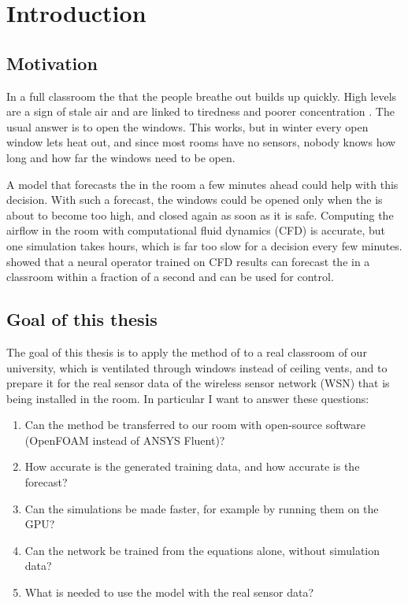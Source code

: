 \chapter{Introduction}
\label{ch:intro}

\section{Motivation}
In a full classroom the \cotwo{} that the people breathe out builds up quickly. High \cotwo{} levels are
a sign of stale air and are linked to tiredness and poorer concentration . The usual answer is to open the windows. This works, but in winter every open
window lets heat out, and since most rooms have no sensors, nobody knows how long and how far the windows
need to be open.

A model that forecasts the \cotwo{} in the room a few minutes ahead could help with this decision. With
such a forecast, the windows could be opened only when the \cotwo{} is about to become too high, and
closed again as soon as it is safe. Computing the airflow in the room with computational fluid dynamics
(CFD) is accurate, but one simulation takes hours, which is far too slow for a decision every few minutes.
\citet{bian2025} showed that a neural operator trained on CFD results can forecast the \cotwo{} in a
classroom within a fraction of a second and can be used for control.

\section{Goal of this thesis}
The goal of this thesis is to apply the method of \citet{bian2025} to a real classroom of our university,
which is ventilated through windows instead of ceiling vents, and to prepare it for the real sensor data of
the wireless sensor network (WSN) that is being installed in the room. In particular I want to answer
these questions:
\begin{enumerate}
  \item Can the method be transferred to our room with open-source software (OpenFOAM instead of
        ANSYS Fluent)?
  \item How accurate is the generated training data, and how accurate is the forecast?
  \item Can the simulations be made faster, for example by running them on the GPU?
  \item Can the network be trained from the equations alone, without simulation data?
  \item What is needed to use the model with the real sensor data?
\end{enumerate}

